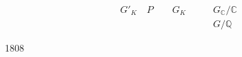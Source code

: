 \[
\begin{aligned}
G'_{K} \quad P \qquad G_{K} &\qquad G_{\mathbb{C}} / \mathbb{C} \\
                            &\qquad G / \mathbb{Q}
\end{aligned}
\]


\noindent %
 1808
